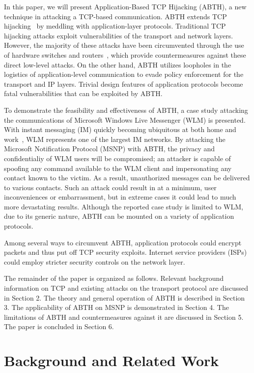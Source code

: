 \documentclass{sig-alternate}
\begin{document}
In this paper, we will present Application-Based TCP Hijacking (ABTH), a new technique in attacking a TCP-based communication. ABTH extends TCP hijacking~\cite{stamp:infosec} by meddling with application-layer protocols. Traditional TCP hijacking attacks exploit vulnerabilities of the transport and network layers. However, the majority of these attacks have been circumvented through the use of hardware switches and routers~\cite{dubrawsky:layer2}, which provide countermeasures against these direct low-level attacks. On the other hand, ABTH utilizes loopholes in the logistics of application-level communication to evade policy enforcement for the transport and IP layers.  Trivial design features of application protocols become fatal vulnerabilities that can be exploited by ABTH.

To demonstrate the feasibility and effectiveness of ABTH, a case study attacking the communications of Microsoft Windows Live Messenger (WLM) is presented. With instant messaging (IM) quickly becoming ubiquitous at both home and work~\cite{aol:survey}, WLM represents one of the largest IM networks. By attacking the Microsoft Notification Protocol (MSNP) with ABTH, the privacy and confidentialiy of WLM users will be compromised; an attacker is capable of spoofing any command available to the WLM client and impersonating any contact known to the victim. As a result, unauthorized messages can be delivered to various contacts. Such an attack could result in at a minimum, user inconveniences or embarrassment, but in extreme cases it could lead to much more devastating results. Although the reported case study is limited to WLM, due to its generic nature, ABTH can be mounted on a variety of application protocols.

Among several ways to circumvent ABTH, application protocols could encrypt packets and thus put off TCP security exploits.
Internet service providers (ISPs) could employ stricter security controls on the network layer.

The remainder of the paper is organized as follows. Relevant background information on TCP and existing attacks on the transport protocol are discussed in Section 2. The theory and general operation of ABTH is described in Section 3.
The applicability of ABTH on MSNP is demonstrated in Section 4. The limitations of ABTH and countermeasures against it are discussed in Section 5. The paper is concluded in Section 6.

\section{Background and Related Work}
\end{document}
